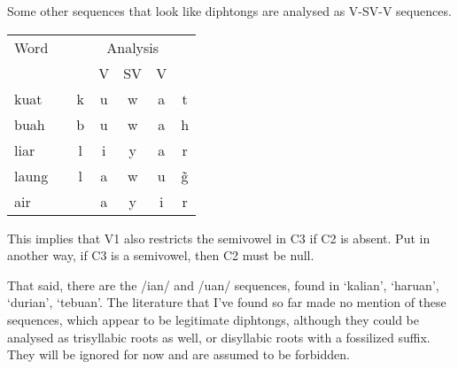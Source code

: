 \documentclass{article}
\begin{document}
Some other sequences that look like diphtongs are analysed as V-SV-V sequences.

\begin{center}
	\begin{tabular}{l c c c c c c}
		\toprule
		Word  & \hspace{2em} & \multicolumn{5}{c}{Analysis} \\
		      &              &   & V & SV & V &             \\ \midrule
		kuat  &              & k & u & w  & a & t           \\
		buah  &              & b & u & w  & a & h           \\
		liar  &              & l & i & y  & a & r           \\
		laung &              & l & a & w  & u & \~g         \\
		air   &              &   & a & y  & i & r           \\ \bottomrule
	\end{tabular}
\end{center}

This implies that V1 also restricts the semivowel in C3 if C2 is absent. Put in another way, if C3 is a semivowel, then C2 must be null. %

That said, there are the /ian/ and /uan/ sequences, found in `kalian', `haruan', `durian', `tebuan'. The literature that I've found so far made no mention of these sequences, which appear to be legitimate diphtongs, although they could be analysed as trisyllabic roots as well, or disyllabic roots with a fossilized suffix. They will be ignored for now and are assumed to be forbidden.


%
%
%
%
\end{document}
